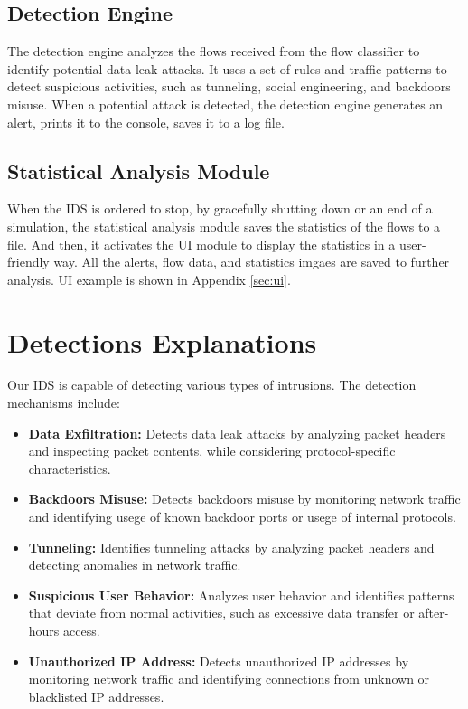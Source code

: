 \documentclass{article}
\begin{document}
\subsection{Detection Engine}
The detection engine analyzes the flows received from the flow classifier to identify potential data leak attacks.
It uses a set of rules and traffic patterns to detect suspicious activities, such as tunneling, social engineering, and backdoors misuse.
When a potential attack is detected, the detection engine generates an alert, prints it to the console, saves it to a log file.

\subsection{Statistical Analysis Module}
When the IDS is ordered to stop, by gracefully shutting down or an end of a simulation, the statistical analysis module saves the statistics of the flows to a file.
And then, it activates the UI module to display the statistics in a user-friendly way.
All the alerts, flow data, and statistics imgaes are saved to further analysis.
UI example is shown in Appendix \ref{sec:ui}.

\section{Detections Explanations}
Our IDS is capable of detecting various types of intrusions. The detection mechanisms include:
\begin{itemize}
    \item \textbf{Data Exfiltration:} Detects data leak attacks by analyzing packet headers and inspecting packet contents, while considering protocol-specific characteristics.
    \item \textbf{Backdoors Misuse:} Detects backdoors misuse by monitoring network traffic and identifying usege of known backdoor ports or usege of internal protocols.
    \item \textbf{Tunneling:} Identifies tunneling attacks by analyzing packet headers and detecting anomalies in network traffic.
    \item \textbf{Suspicious User Behavior:} Analyzes user behavior and identifies patterns that deviate from normal activities, such as excessive data transfer or after-hours access.
    \item \textbf{Unauthorized IP Address:} Detects unauthorized IP addresses by monitoring network traffic and identifying connections from unknown or blacklisted IP addresses.
\end{itemize}
\end{document}
